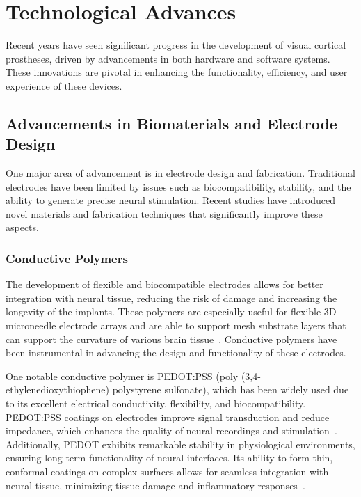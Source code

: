 \documentclass[twocolumn,10pt]{article}
\begin{document}
\section*{Technological Advances}\label{sec:tech_advances}
Recent years have seen significant progress in the development of visual
cortical prostheses, driven by advancements in both hardware and software
systems. These innovations are pivotal in enhancing the functionality,
efficiency, and user experience of these devices.

\subsection*{Advancements in Biomaterials and Electrode Design}
One major area of advancement is in electrode design and fabrication.
Traditional electrodes have been limited by issues such as biocompatibility,
stability, and the ability to generate precise neural stimulation. Recent
studies have introduced novel materials and fabrication techniques that
significantly improve these aspects.

\subsubsection*{Conductive Polymers}
The development of flexible and biocompatible electrodes allows for better
integration with neural tissue, reducing the risk of damage and increasing the
longevity of the implants. These polymers are especially useful for flexible 3D
microneedle electrode arrays and are able to support mesh substrate layers that
can support the curvature of various brain
tissue~\parencite{xiangFlexibleThreedimensionalElectrode2016}. Conductive
polymers have been instrumental in advancing the design and functionality of
these electrodes.

One notable conductive polymer is PEDOT:PSS (poly (3,4-ethylenedioxythiophene)
polystyrene sulfonate), which has been widely used due to its excellent
electrical conductivity, flexibility, and biocompatibility. PEDOT:PSS coatings
on electrodes improve signal transduction and reduce impedance, which enhances
the quality of neural recordings and
stimulation~\parencite{rivnayHighperformanceTransistorsBioelectronics2015}.
Additionally, PEDOT exhibits remarkable stability in physiological environments,
ensuring long-term functionality of neural interfaces. Its ability to form thin,
conformal coatings on complex surfaces allows for seamless integration with
neural tissue, minimizing tissue damage and inflammatory
responses~\parencite{zhangRecentProgressPEDOTbased2022}.
\end{document}
